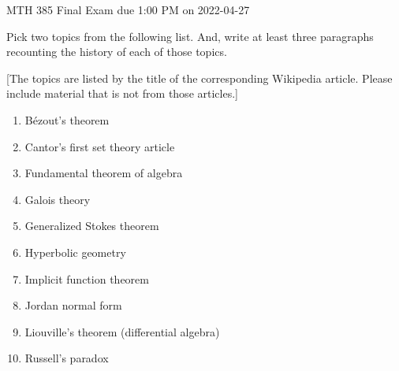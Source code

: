 \documentclass[12pt]{article}
\theoremstyle{plain}
\begin{document}
MTH 385 \qquad Final Exam \hfill due 1:00 PM on 2022-04-27

Pick two topics from the following list. And, write at least three paragraphs recounting the history of each of those topics.

[The topics are listed by the title of the corresponding Wikipedia article. Please include material that is not from those articles.]
\begin{enumerate}[1.]
    \item B\'{e}zout's theorem
    \item Cantor's first set theory article
    \item Fundamental theorem of algebra
    \item Galois theory
    \item Generalized Stokes theorem
    \item Hyperbolic geometry
    \item Implicit function theorem
    \item Jordan normal form
    \item Liouville's theorem (differential algebra)
    \item Russell's paradox
\end{enumerate}
\end{document}
